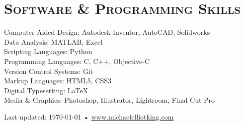 \documentclass[12pt, letterpaper]{article} %
\newcommand{\years}[1]{\marginnote{\scriptsize #1}} %
\begin{document}
\section*{\scshape Software \& Programming Skills}
Computer Aided Design: Autodesk Inventor, AutoCAD, Solidworks\\
Data Analysis: MATLAB, Excel\\
Scripting Languages: Python\\
Programming Languages: C, C++, Objective-C\\
Version Control Systems: Git\\
Markup Languages: HTML5, CSS3\\
Digital Typesetting: \LaTeX \\
Media \& Graphics: Photoshop, Illustrator, Lightroom, Final Cut Pro



\vfill{}


\begin{center}
{\scriptsize Last updated: \today\- •\- \href{http://www.michaelelliotking.com}{www.michaelelliotking.com}}
\end{center}
\end{document}
